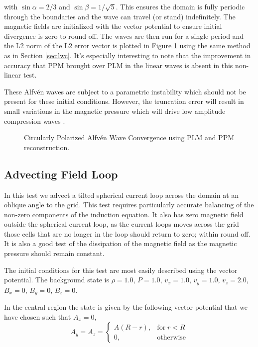 with $\sin\alpha = 2/3$ and $\sin\beta = 1/\sqrt{5}$. This ensures the domain is fully periodic through the boundaries and the wave can travel (or stand) indefinitely. The magnetic fields are initialized with the vector potential to ensure initial divergence is zero to round off. The waves are then run for a single period and the L2 norm of the L2 error vector is plotted in Figure \ref{fig:cpaw} using the same method as in Section \ref{sec:lwc}. It's especially interesting to note that the improvement in accuracy that PPM brought over PLM in the linear waves is absent in this non-linear test.

These Alfv\'en waves are subject to a parametric instability \citep{del_zanna_parametric_2001} which should not be present for these initial conditions. However, the truncation error will result in small variations in the magnetic pressure which will drive low amplitude compression waves \citep{stone_athena_2008}. 

\begin{figure}[ht!]
    \caption{Circularly Polarized Alfv\'en Wave Convergence using PLM and PPM reconstruction. }
    \label{fig:cpaw}
\end{figure}

\subsection{Advecting Field Loop}
\label{sec:afl}

In this test we advect a tilted spherical current loop across the domain at an oblique angle to the grid. This test requires particularly accurate balancing of the non-zero components of the induction equation. It also has zero magnetic field outside the spherical current loop, as the current loops moves across the grid those cells that are no longer in the loop should return to zero; within round off. It is also a good test of the dissipation of the magnetic field as the magnetic pressure should remain constant.

The initial conditions for this test are most easily described using the vector potential. The background state is
$\rho = 1.0$,
$P = 1.0$,
$v_x = 1.0$,
$v_y = 1.0$,
$v_z = 2.0$,
$B_x = 0$,
$B_y = 0$,
$B_z = 0$.

In the central region the state is given by the following vector potential that we have chosen such that $A_x = 0$,
\begin{equation}
    A_y = A_z = 
    \begin{cases}
        A \left( R - r \right),& \text{for}\; r < R\\
        0,              & \text{otherwise}
    \end{cases}
\end{equation}

